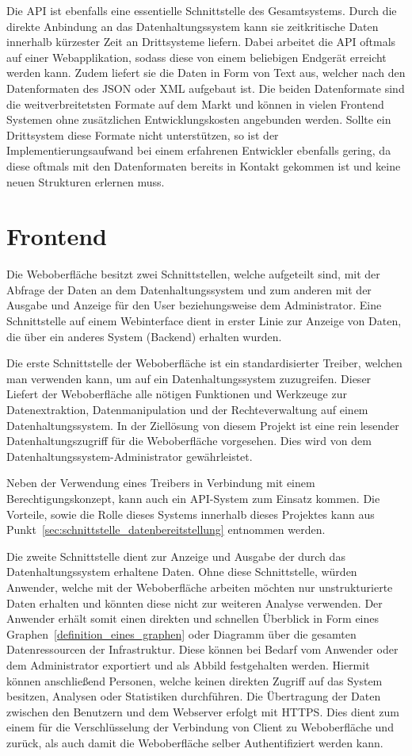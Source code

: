 Die API ist ebenfalls eine essentielle Schnittstelle des Gesamtsystems. Durch
die direkte Anbindung an das Datenhaltungssystem kann sie zeitkritische Daten
innerhalb kürzester Zeit an Drittsysteme liefern. Dabei arbeitet die API
oftmals auf einer Webapplikation, sodass diese von einem beliebigen Endgerät
erreicht werden kann. Zudem liefert sie die Daten in Form von Text aus, welcher
nach den Datenformaten des \gls{JSON} oder \gls{XML} aufgebaut ist. Die beiden
Datenformate sind die weitverbreitetsten Formate auf dem Markt und können in
vielen Frontend Systemen ohne zusätzlichen Entwicklungskosten angebunden
werden. Sollte ein Drittsystem diese Formate nicht unterstützen, so ist der
Implementierungsaufwand bei einem erfahrenen Entwickler ebenfalls gering, da
diese oftmals mit den Datenformaten bereits in Kontakt gekommen ist und keine
neuen Strukturen erlernen muss.
\nl%

\section{Frontend}
Die Weboberfläche besitzt zwei Schnittstellen, welche aufgeteilt sind, mit der
Abfrage der Daten an dem Datenhaltungssystem und zum anderen mit der Ausgabe
und Anzeige für den User beziehungsweise dem Administrator. Eine Schnittstelle
auf einem Webinterface dient in erster Linie zur Anzeige von Daten, die über
ein anderes System (Backend) erhalten wurden.

Die erste Schnittstelle der Weboberfläche ist ein standardisierter Treiber,
welchen man verwenden kann, um auf ein Datenhaltungssystem zuzugreifen. Dieser
Liefert der Weboberfläche alle nötigen Funktionen und Werkzeuge zur
Datenextraktion, Datenmanipulation und der Rechteverwaltung auf einem
Datenhaltungssystem. In der Ziellösung von diesem Projekt ist eine rein
lesender Datenhaltungszugriff für die Weboberfläche vorgesehen. Dies wird von
dem Datenhaltungssystem-Administrator gewährleistet.

Neben der Verwendung eines Treibers in Verbindung mit einem
Berechtigungskonzept, kann auch ein API-System zum Einsatz kommen. Die
Vorteile, sowie die Rolle dieses Systems innerhalb dieses Projektes kann aus
Punkt~\ref{sec:schnittstelle_datenbereitstellung} entnommen werden.

Die zweite Schnittstelle dient zur Anzeige und Ausgabe der durch das
Datenhaltungssystem erhaltene Daten. Ohne diese Schnittstelle, würden Anwender,
welche mit der Weboberfläche arbeiten möchten nur unstrukturierte Daten
erhalten und könnten diese nicht zur weiteren Analyse verwenden. Der Anwender
erhält somit einen direkten und schnellen Überblick in Form eines
Graphen~\ref{definition_eines_graphen} oder Diagramm über die gesamten
Datenressourcen der Infrastruktur. Diese können bei Bedarf vom Anwender oder
dem Administrator exportiert und als Abbild festgehalten werden. Hiermit können
anschließend Personen, welche keinen direkten Zugriff auf das System besitzen,
Analysen oder Statistiken durchführen. Die Übertragung der Daten zwischen den
Benutzern und dem Webserver erfolgt mit \gls{HTTPS}. Dies dient zum einem für
die Verschlüsselung der Verbindung von Client zu Weboberfläche und zurück, als
auch damit die Weboberfläche selber Authentifiziert werden kann.
\mr%

